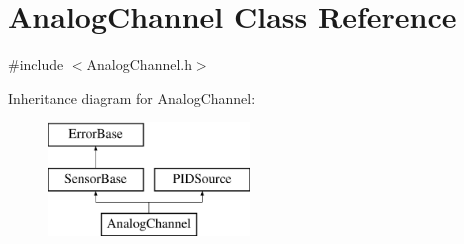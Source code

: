 \hypertarget{classAnalogChannel}{
\section{AnalogChannel Class Reference}
\label{classAnalogChannel}
}


{\ttfamily \#include $<$AnalogChannel.h$>$}

Inheritance diagram for AnalogChannel:\begin{figure}[H]
\begin{center}
\leavevmode
\includegraphics[height=3.000000cm]{classAnalogChannel}
\end{center}
\end{figure}
